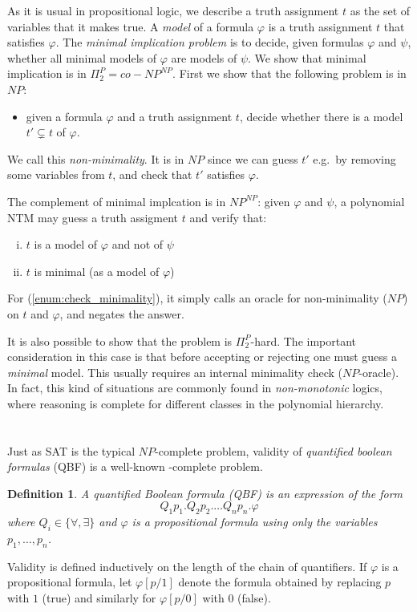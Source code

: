 \documentclass{report}
\newcommand{\NP}{\text{$\mathit{NP}$}\xspace}
\newcommand{\Po}{\text{$\mathit{P}$}\xspace}
\newcommand{\PSpace}{\text{$\mathit{PSpace}$}\xspace}
\newtheorem{definition}{Definition}[chapter]
\begin{document}
As it is usual in propositional logic, we describe a truth assignment $t$ as the set of variables that it makes true. A \emph{model} of a formula $\varphi$ is a truth assignment $t$ that satisfies $\varphi$. The \emph{minimal implication problem} is to decide, given formulas $\varphi$ and $\psi$, whether all minimal models of $\varphi$ are models of $\psi$. We show that minimal implication is in $\Pi_2^\Po = co-\NP^\NP$. First we show that the following problem is in $\NP$: 
\begin{itemize}
 \item given a formula $\varphi$ and a truth assignment $t$, decide whether there is a model $t' \subsetneq t$ of $\varphi$. 
\end{itemize}
We call this \emph{non-minimality}. It is in $\NP$ since we can guess $t'$ e.g.\ by removing some variables from $t$, and check that $t'$ satisfies $\varphi$. 

The complement of minimal implcation is in $\NP^\NP$: given $\varphi$ and $\psi$, a polynomial NTM may guess a truth assigment $t$ and verify that:
\begin{enumerate}[(i)]
 \item $t$ is a model of $\varphi$ and not of $\psi$
 \item $t$ is minimal (as a model of $\varphi$) \label{enum:check_minimality}
\end{enumerate}
For (\ref{enum:check_minimality}), it simply calls an oracle for non-minimality ($\NP$) on $t$ and $\varphi$, and negates the answer. 

It is also possible to show that the problem is $\Pi_2^\Po$-hard. The important consideration in this case is that before accepting or rejecting one must guess a \emph{minimal} model. This usually requires an internal minimality check ($\NP$-oracle). In fact, this kind of situations are commonly found in \emph{non-monotonic} logics, where reasoning is complete for different classes in the polynomial hierarchy. 

\section*{\PSpace}
Just as SAT is the typical $\NP$-complete problem, validity of \emph{quantified boolean formulas} (QBF) is a well-known \PSpace-complete problem. 

\begin{definition} A quantified Boolean formula (QBF) is an expression of the form 
\[ Q_1p_1.Q_2p_2. \ldots Q_np_n.\varphi \]
where $Q_i \in \{\forall, \exists\}$ and $\varphi$ is a propositional formula using only the variables $p_1, \ldots, p_n$.   
\end{definition}
Validity is defined inductively on the length of the chain of quantifiers. If $\varphi$ is a propositional formula, let $\varphi[p/1]$ denote the formula obtained by replacing $p$ with $1$ (true) and similarly for $\varphi[p/0]$ with $0$ (false). 
\end{document}

